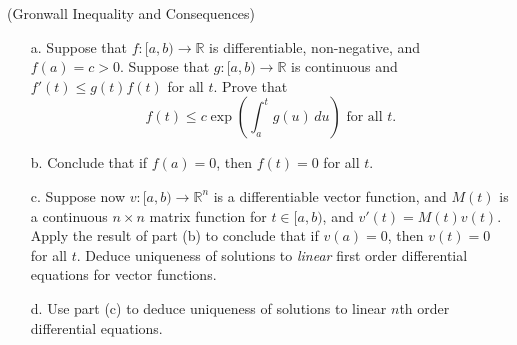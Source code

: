 \documentclass[Shifrin_Solutions_Spring_2015]{subfiles}
\begin{document}
\begin{exercise}(Gronwall Inequality and Consequences)
\begin{itemize}
\item[a.] Suppose that $f:[a,b)\rightarrow \mathbb{R}$ is differentiable, non-negative, and $f(a) = c > 0$. Suppose that $g:[a,b) \rightarrow \mathbb{R}$ is continuous and $f'(t) \leq g(t)f(t)$ for all $t$. Prove that
\[
f(t) \leq c \exp\left(\int_a^t g(u)\, du\right) \text{ for all $t$.}
\]

\item[b.] Conclude that if $f(a) = 0$, then $f(t) = 0$ for all $t$.

\item[c.] Suppose now $v:[a,b)\rightarrow \mathbb{R}^n$ is a differentiable vector function, and $M(t)$ is a continuous $n\times n$ matrix function for $t \in [a,b)$, and $v'(t) = M(t)v(t)$. Apply the result of part (b) to conclude that if $v(a) = 0$, then $v(t) = 0$ for all $t$. Deduce uniqueness of solutions to \emph{linear} first order differential equations for vector functions.

\item[d.] Use part (c) to deduce uniqueness of solutions to linear $n$th order differential equations.

\end{itemize}
\end{exercise}
\end{document}

